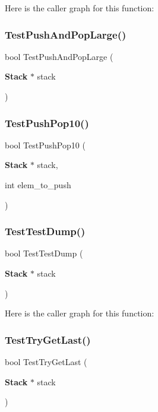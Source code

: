 Here is the caller graph for this function\+:
\mbox{\label{tests_8h_af81b3e5901fbd73cbb0b7a3ed7704e51}} 
\subsubsection{Test\+Push\+And\+Pop\+Large()}
{\footnotesize\ttfamily bool Test\+Push\+And\+Pop\+Large (\begin{DoxyParamCaption}\item[{\textbf{ Stack} $\ast$}]{stack }\end{DoxyParamCaption})}

\mbox{\label{tests_8h_a32759c0f06fdeae9ffeb7371bdd2661f}} 
\subsubsection{Test\+Push\+Pop10()}
{\footnotesize\ttfamily bool Test\+Push\+Pop10 (\begin{DoxyParamCaption}\item[{\textbf{ Stack} $\ast$}]{stack,  }\item[{int}]{elem\+\_\+to\+\_\+push }\end{DoxyParamCaption})}

\mbox{\label{tests_8h_aa9e48237f5e9e2e7f2379e72032a2195}} 
\subsubsection{Test\+Test\+Dump()}
{\footnotesize\ttfamily bool Test\+Test\+Dump (\begin{DoxyParamCaption}\item[{\textbf{ Stack} $\ast$}]{stack }\end{DoxyParamCaption})}

Here is the caller graph for this function\+:
\mbox{\label{tests_8h_ac7a82f8f1be1561e3a02765f176c3dc6}} 
\subsubsection{Test\+Try\+Get\+Last()}
{\footnotesize\ttfamily bool Test\+Try\+Get\+Last (\begin{DoxyParamCaption}\item[{\textbf{ Stack} $\ast$}]{stack }\end{DoxyParamCaption})}

